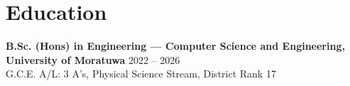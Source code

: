 \section*{Education}
\BigDivider
\noindent
\textbf{B.Sc. (Hons) in Engineering --- Computer Science and Engineering, University of Moratuwa}
\hfill 2022 -- 2026\\
G.C.E. A/L: 3 A's, Physical Science Stream, District Rank 17
